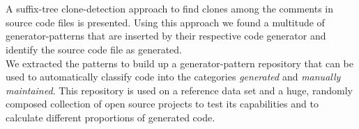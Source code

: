 \chapter{\abstractname}

A suffix-tree clone-detection approach to find clones among the comments in source code files is presented. Using this approach we found a multitude of generator-patterns that are inserted by their respective code generator and identify the source code file as generated. \\
We extracted the patterns to build up a generator-pattern repository that can be used to automatically classify code into the categories \textit{generated} and \textit{manually maintained}. This repository is used on a reference data set and a huge, randomly composed collection of open source projects to test its capabilities and to calculate different proportions of generated code.
